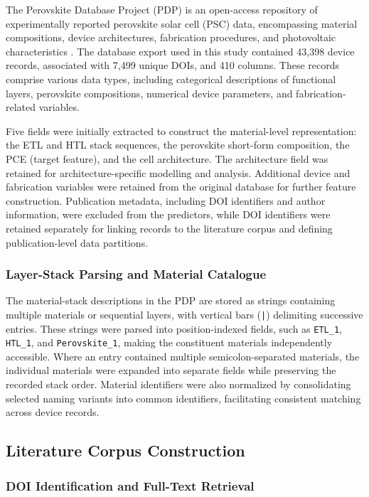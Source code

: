 \documentclass[3p]{elsarticle}
\begin{document}
The Perovskite Database Project (PDP) is an open-access repository of experimentally reported perovskite solar cell (PSC) data, encompassing material compositions, device architectures, fabrication procedures, and photovoltaic characteristics \cite{jacobsson2022open}. The database export used in this study contained 43,398 device records, associated with 7,499 unique DOIs, and 410 columns. These records comprise various data types, including categorical descriptions of functional layers, perovskite compositions, numerical device parameters, and fabrication-related variables.

Five fields were initially extracted to construct the material-level representation: the ETL and HTL stack sequences, the perovskite short-form composition, the PCE (target feature), and the cell architecture. The architecture field was retained for architecture-specific modelling and analysis. Additional device and fabrication variables were retained from the original database for further feature construction. Publication metadata, including DOI identifiers and author information, were excluded from the predictors, while DOI identifiers were retained separately for linking records to the literature corpus and defining publication-level data partitions.

\subsubsection{Layer-Stack Parsing and Material Catalogue}

The material-stack descriptions in the PDP are stored as strings containing multiple materials or sequential layers, with vertical bars (\texttt{|}) delimiting successive entries. These strings were parsed into position-indexed fields, such as \texttt{ETL\_1}, \texttt{HTL\_1}, and \texttt{Perovskite\_1}, making the constituent materials independently accessible. Where an entry contained multiple semicolon-separated materials, the individual materials were expanded into separate fields while preserving the recorded stack order. Material identifiers were also normalized by consolidating selected naming variants into common identifiers, facilitating consistent matching across device records.

\subsection{Literature Corpus Construction}

\subsubsection{DOI Identification and Full-Text Retrieval}
\end{document}

